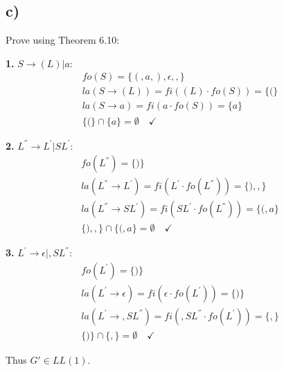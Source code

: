 \subsection*{c)}

Prove using Theorem 6.10:

\textbf{1.} $S \rightarrow (L) | a$:
\begin{equation*}
\begin{split}
fo(S) = \{(, a, ), \epsilon, ,\} \\
la(S \rightarrow (L)) = fi((L) \cdot fo(S)) = \{ ( \} \\
la(S \rightarrow a) = fi(a \cdot fo(S)) = \{ a \} \\
\{ ( \} \cap \{ a \} = \emptyset \quad \checkmark
\end{split}
\end{equation*}

\textbf{2.} $L^{''} \rightarrow L^{'} | SL^{'}$:
\begin{equation*}
\begin{split}
fo(L^{''}) = \{)\} \\
la(L^{''} \rightarrow L^{'}) = fi(L^{'} \cdot fo(L^{''})) = \{ ), , \} \\
la(L^{''} \rightarrow SL^{'}) = fi(SL^{'} \cdot fo(L^{''})) = \{ (, a \} \\
\{ ), , \} \cap \{ (, a \} = \emptyset \quad \checkmark
\end{split}
\end{equation*}

\textbf{3.} $L^{'} \rightarrow \epsilon | ,SL^{''}$:
\begin{equation*}
\begin{split}
fo(L^{'}) = \{)\} \\
la(L^{'} \rightarrow \epsilon) = fi(\epsilon \cdot fo(L^{'})) = \{ ) \} \\
la(L^{'} \rightarrow ,SL^{''}) = fi(,SL^{''} \cdot fo(L^{'})) = \{ , \} \\
\{ ) \} \cap \{ , \} = \emptyset \quad \checkmark
\end{split}
\end{equation*}

Thus $G' \in LL(1)$.